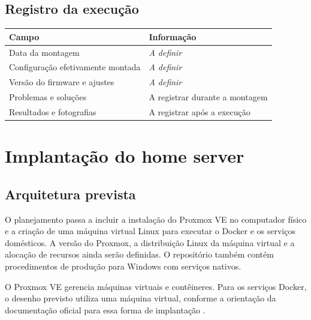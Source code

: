 \documentclass[11pt,a4paper,oneside]{report}
\newcommand{\pendente}{\textit{A definir}}
\begin{document}
\section{Registro da execução}
\begin{tabularx}{\textwidth}{@{}p{4.4cm}Y@{}}
\toprule
Campo & Informação \\
\midrule
Data da montagem & \pendente \\
Configuração efetivamente montada & \pendente \\
Versão do firmware e ajustes & \pendente \\
Problemas e soluções & A registrar durante a montagem \\
Resultados e fotografias & A registrar após a execução \\
\bottomrule
\end{tabularx}

\chapter{Implantação do home server}
\section{Arquitetura prevista}
O planejamento passa a incluir a instalação do Proxmox VE no computador físico
e a criação de uma máquina virtual Linux para executar o Docker e os serviços
domésticos. A versão do Proxmox, a distribuição Linux da máquina virtual e a
alocação de recursos ainda serão definidas. O repositório também contém
procedimentos de produção para Windows com serviços nativos.

O Proxmox VE gerencia máquinas virtuais e contêineres. Para os serviços Docker,
o desenho previsto utiliza uma máquina virtual, conforme a orientação da
documentação oficial para essa forma de implantação \cite{proxmox}.

\begin{center}
\end{center}
\end{document}
